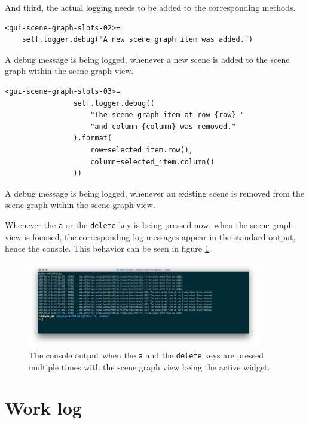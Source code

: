 \documentclass[10pt, openright, notitlepage]{scrreprt}
\begin{document}
And third, the actual logging needs to be added to the corresponding methods.

\begin{listing}[H]
\begin{verbatim}
<gui-scene-graph-slots-02>=
    self.logger.debug("A new scene graph item was added.")
\end{verbatim}
\caption{\label{lst:gui-scene-graph-slots-02-logging}
A debug message is being logged, whenever a new scene is added to the scene graph within the scene graph view.}
\end{listing}

\begin{listing}[H]
\begin{verbatim}
<gui-scene-graph-slots-03>=
                self.logger.debug((
                    "The scene graph item at row {row} "
                    "and column {column} was removed."
                ).format(
                    row=selected_item.row(),
                    column=selected_item.column()
                ))
\end{verbatim}
\caption{\label{lst:gui-scene-graph-slots-03-logging}
A debug message is being logged, whenever an existing scene is removed from the scene graph within the scene graph view.}
\end{listing}

Whenever the \texttt{a} or the \texttt{delete} key is being pressed now, when the scene graph
view is focused, the corresponding log messages appear in the standard output,
hence the console. This behavior can be seen in figure \ref{fig:editor-alpha-04}.

\begin{figure}[H]
\centering
\includegraphics[width=4in]{./images/qde_alpha_04.png}
\caption{\label{fig:editor-alpha-04}
The console output when the \texttt{a} and the \texttt{delete} keys are pressed multiple times with the scene graph view being the active widget.}
\end{figure}

\chapter{Work log}
\label{sec:orgb06db17}
\end{document}
